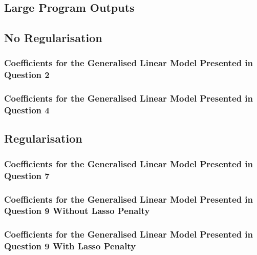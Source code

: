 \documentclass[11pt]{article} %
\begin{document}
\clearpage
\begin{appendices}
\section{Large Program Outputs}
\subsection{No Regularisation}
\subsubsection{Coefficients for the Generalised Linear Model Presented in Question 2}
\label{appendix:coefs_1}
\begin{multicols}{2}

\end{multicols}

\subsubsection{Coefficients for the Generalised Linear Model Presented in Question 4}
\label{appendix:coefs_2}
\begin{multicols}{2}

\end{multicols}

\subsection{Regularisation}
\subsubsection{Coefficients for the Generalised Linear Model Presented in Question 7}
\label{appendix:coefs_3}
\begin{multicols}{2}

\end{multicols}

\subsubsection{Coefficients for the Generalised Linear Model Presented in Question 9 Without Lasso Penalty}
\label{appendix:coefs_4}
\begin{multicols}{2}

\end{multicols}

\subsubsection{Coefficients for the Generalised Linear Model Presented in Question 9 With Lasso Penalty}
\label{appendix:coefs_5}
\begin{multicols}{2}

\end{multicols}

\end{appendices}
\clearpage
\end{document}
